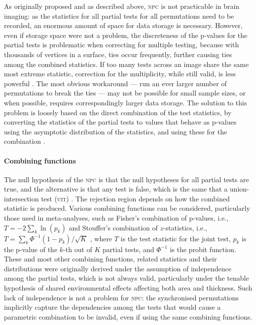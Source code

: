 As originally proposed and as described above, \textsc{npc} is not practicable in brain imaging: as the statistics for all partial tests for all permutations need to be recorded, an enormous amount of space for data storage is necessary. However, even if storage space were not a problem, the discreteness of the p-values for the partial tests is problematic when correcting for multiple testing, because with thousands of vertices in a surface, ties occur frequently, further causing ties among the combined statistics. If too many tests across an image share the same most extreme statistic, correction for the multiplicity, while still valid, is less powerful \citep{Westfall1993, Pantazis2005}. The most obvious workaround --- run an ever larger number of permutations to break the ties --- may not be possible for small sample sizes, or when possible, requires correspondingly larger data storage. The solution to this problem is loosely based on the direct combination of the test statistics, by converting the statistics of the partial tests to values that behave as p-values using the asymptotic distribution of the statistics, and using these for the combination \citep{Winkler2016_npc}.

\paragraph{Combining functions}

The null hypothesis of the \textsc{npc} is that the null hypotheses for all partial tests are true, and the alternative is that any test is false, which is the same that a union-intersection test (\textsc{uit}) \citep{Roy1953}. The rejection region depends on how the combined statistic is produced. Various combining functions can be considered, particularly those used in meta-analyses, such as Fisher's combination of p-values, i.e., $T=-2\sum_k\ln(p_k)$ \citep{Fisher1932} and Stouffer's combination of $z$-statistics, i.e., $T = \sum_k \Phi^{-1}(1-p_k)/\sqrt{K}$ \citep{Stouffer1949}, where $T$ is the test statistic for the joint test, $p_k$ is the p-value of the $k$-th out of $K$ partial tests, and $\Phi^{-1}$ is the probit function. These and most other combining functions, related statistics and their distributions were originally derived under the assumption of independence among the partial tests, which is not always valid, particularly under the tenable hypothesis of shared environmental effects affecting both area and thickness. Such lack of independence is not a problem for \textsc{npc}: the synchronised permutations implicitly capture the dependencies among the tests that would cause a parametric combination to be invalid, even if using the same combining functions.

